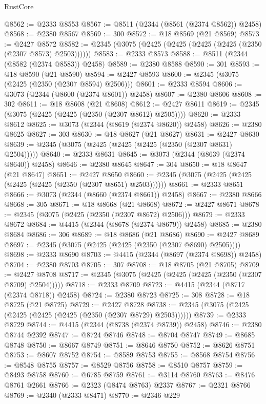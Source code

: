 \begin{lexlean}{RustCore}
\begin{coremodule}
@8562 := @2333 @8553
@8567 := @8511 (@2344 (@8561 (@2374 @8562)) @2458)
@8568 := @2380 @8567
@8569 := 300
@8572 := @18 @8569 (@21 @8569)
@8573 := @2427 @8572
@8582 := @2345 (@3075 (@2425 (@2425 (@2425 (@2425 (@2350 (@2307 @8573) @2503))))))
@8583 := @2333 @8573
@8588 := @8511 (@2344 (@8582 (@2374 @8583)) @2458)
@8589 := @2380 @8588
@8590 := 301
@8593 := @18 @8590 (@21 @8590)
@8594 := @2427 @8593
@8600 := @2345 (@3075 (@2425 (@2350 (@2307 @8594) @2506)))
@8601 := @2333 @8594
@8606 := @3073 (@2344 (@8600 (@2374 @8601)) @2458)
@8607 := @2380 @8606
@8608 := 302
@8611 := @18 @8608 (@21 @8608)
@8612 := @2427 @8611
@8619 := @2345 (@3075 (@2425 (@2425 (@2350 (@2307 @8612) @2505))))
@8620 := @2333 @8612
@8625 := @3073 (@2344 (@8619 (@2374 @8620)) @2458)
@8626 := @2380 @8625
@8627 := 303
@8630 := @18 @8627 (@21 @8627)
@8631 := @2427 @8630
@8639 := @2345 (@3075 (@2425 (@2425 (@2425 (@2350 (@2307 @8631) @2504)))))
@8640 := @2333 @8631
@8645 := @3073 (@2344 (@8639 (@2374 @8640)) @2458)
@8646 := @2380 @8645
@8647 := 304
@8650 := @18 @8647 (@21 @8647)
@8651 := @2427 @8650
@8660 := @2345 (@3075 (@2425 (@2425 (@2425 (@2425 (@2350 (@2307 @8651) @2503))))))
@8661 := @2333 @8651
@8666 := @3073 (@2344 (@8660 (@2374 @8661)) @2458)
@8667 := @2380 @8666
@8668 := 305
@8671 := @18 @8668 (@21 @8668)
@8672 := @2427 @8671
@8678 := @2345 (@3075 (@2425 (@2350 (@2307 @8672) @2506)))
@8679 := @2333 @8672
@8684 := @4415 (@2344 (@8678 (@2374 @8679)) @2458)
@8685 := @2380 @8684
@8686 := 306
@8689 := @18 @8686 (@21 @8686)
@8690 := @2427 @8689
@8697 := @2345 (@3075 (@2425 (@2425 (@2350 (@2307 @8690) @2505))))
@8698 := @2333 @8690
@8703 := @4415 (@2344 (@8697 (@2374 @8698)) @2458)
@8704 := @2380 @8703
@8705 := 307
@8708 := @18 @8705 (@21 @8705)
@8709 := @2427 @8708
@8717 := @2345 (@3075 (@2425 (@2425 (@2425 (@2350 (@2307 @8709) @2504)))))
@8718 := @2333 @8709
@8723 := @4415 (@2344 (@8717 (@2374 @8718)) @2458)
@8724 := @2380 @8723
@8725 := 308
@8728 := @18 @8725 (@21 @8725)
@8729 := @2427 @8728
@8738 := @2345 (@3075 (@2425 (@2425 (@2425 (@2425 (@2350 (@2307 @8729) @2503))))))
@8739 := @2333 @8729
@8744 := @4415 (@2344 (@8738 (@2374 @8739)) @2458)
@8746 := @2380 @8744 @2392
@8747 := @8724 @8746
@8748 := @8704 @8747
@8749 := @8685 @8748
@8750 := @8667 @8749
@8751 := @8646 @8750
@8752 := @8626 @8751
@8753 := @8607 @8752
@8754 := @8589 @8753
@8755 := @8568 @8754
@8756 := @8548 @8755
@8757 := @8529 @8756
@8758 := @8510 @8757
@8759 := @8493 @8758
@8760 := @6785 @8759
@8761 := @3114 @8760
@8763 := @8476 @8761 @2661
@8766 := @2323 (@8474 @8763) @2337
@8767 := @2321 @8766
@8769 := @2340 (@2333 @8471)
@8770 := @2346 @229

\end{coremodule}
\end{lexlean}
